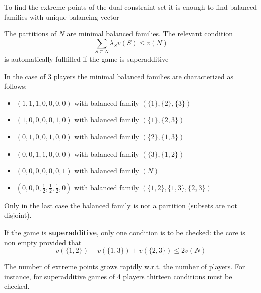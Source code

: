 \documentclass[../main.tex]{subfiles}
\begin{document}
To find the extreme points of the dual constraint set it is enough to find balanced families with unique balancing vector
\begin{remark}
    The partitions of $N$ are minimal balanced families. The relevant condition
    \[
        \sum_{S \subseteq N} \lambda_S v(S) \leq v(N)
    \]
    is automatically fullfilled if the game is superadditive
\end{remark}
\begin{example}
    In the case of 3 players the minimal balanced families are characterized as follows:
    \begin{itemize}
        \item $(1,1,1,0,0,0,0)$ with balanced family $(\{1\},\{2\},\{3\})$
        \item $(1,0,0,0,0,1,0)$ with balanced family $(\{1\},\{2,3\})$
        \item $(0,1,0,0,1,0,0)$ with balanced family $(\{2\},\{1,3\})$
        \item $(0, 0, 1, 1, 0, 0, 0)$ with balanced family $(\{3\}, \{1, 2\})$
        \item $(0, 0, 0, 0, 0, 0, 1)$ with balanced family $(N)$
        \item $(0, 0, 0, \frac{1}{2}, \frac{1}{2}, \frac{1}{2}, 0)$ with balanced family $(\{1, 2\}, \{1, 3\}, \{2, 3\})$
    \end{itemize}
    Only in the last case the balanced family is not a partition (subsets are not disjoint).
\end{example}
\begin{remark}
    If the game is \textbf{superadditive}, only one condition is to be checked: the core is non empty provided that
    \[
        v(\{1, 2\}) + v(\{1, 3\}) + v(\{2, 3\}) \leq 2 v(N)
    \]
\end{remark}
The number of extreme points grows rapidly w.r.t. the number of players. For instance, for superadditive games of 4 players thirteen conditions must be checked.
\end{document}
